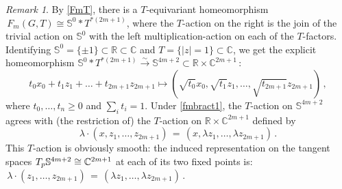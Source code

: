 \documentclass[11pt]{amsart}
\theoremstyle{definition}
\theoremstyle{remark}
\newtheorem{remark}[theorem]{Remark}
\numberwithin{equation}{section}
\newcommand{\la}{\label}
\def\bS{\mathbb S}
\def\C{\mathbb C}
\def\c{\mathbb{C}}
\begin{document}
\begin{remark} \la{fmvsArnld}
By \eqref{FmT}, there is a $T$-equivariant homeomorphism
$\,F_m(G,T) \cong \bS^0 \ast T^{\ast (2m+1)}$, where the $T$-action on the right is the join of the trivial action on $\bS^0 $ with the left multiplication-action on each of the $T$-factors. Identifying $\bS^0 = \{ \pm 1\} \subset \mathbb{R} \subset \C $ and $T =  \{|z|=1\} \subset \c$, we get the explicit homeomorphism $
\bS^0 \ast T^{\ast (2m+1)} \xrightarrow{\sim} \bS^{4m+2} \subset \mathbb{R} \times \c^{2m+1}\, $: 
%
\begin{equation} 
\la{fmbract1} 
t_0x_0 + t_1 z_1 +\ldots +t_{2m+1}z_{2m+1} \mapsto  (\sqrt{t_0}x_0, \sqrt{t_1}z_1,\ldots, \sqrt{t_{2m+1}}z_{2m+1}) \,,
\end{equation}
%
where $t_0,\ldots,t_n \geqslant 0$ and $\sum_i t_i=1$. Under \eqref{fmbract1}, the $T$-action on $\bS^{4m+2} $ agrees with (the restriction
of) the $T$-action on $ \mathbb{R} \times \c^{2m+1} $ defined by
%
\begin{equation} 
\la{fmbract2} 
\lambda \cdot (x,z_1,\ldots, z_{2m+1}) \,=\,(x,\lambda z_1,\ldots, \lambda z_{2m+1})\,.\end{equation}
%
This $T$-action is obviously smooth: the induced representation on the tangent spaces ${\rm T}_p\bS^{4m+2} \cong \c^{2m+1}$ at each of its two fixed points is:
$\,\lambda \cdot (z_1,\ldots, z_{2m+1}) \,=\,(\lambda z_1,\ldots, \lambda z_{2m+1})\,$.


\end{remark}
\end{document}
